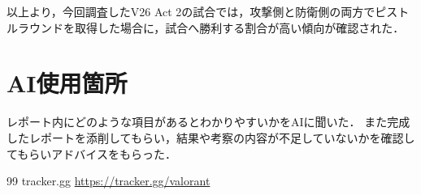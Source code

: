 \documentclass[titlepage,a4paper]{jsarticle}
\begin{document}
以上より，今回調査したV26 Act 2の試合では，攻撃側と防衛側の両方でピストルラウンドを取得した場合に，試合へ勝利する割合が高い傾向が確認された．

\section{AI使用箇所}
  レポート内にどのような項目があるとわかりやすいかをAIに聞いた．
  また完成したレポートを添削してもらい，結果や考察の内容が不足していないかを確認してもらいアドバイスをもらった．

\begin{thebibliography}{99}
   tracker.gg \url{https://tracker.gg/valorant}
\end{thebibliography}
\end{document}
